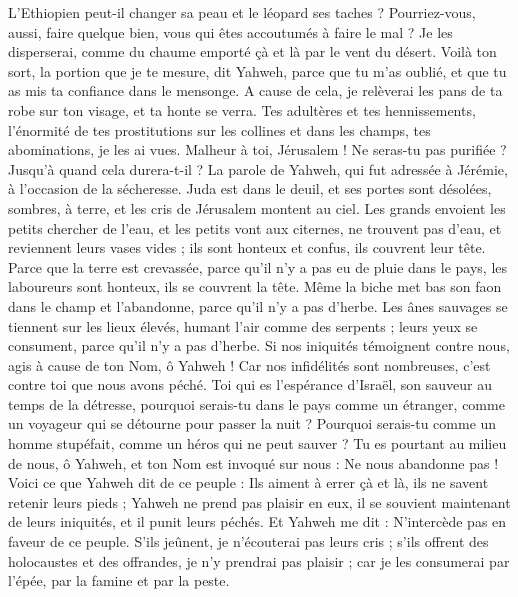 \begin{multicols}{2}
L'Ethiopien peut-il changer sa peau et le léopard ses taches ? Pourriez-vous, aussi, faire quelque bien, vous qui êtes accoutumés à faire le mal ?
Je les disperserai, comme du chaume emporté çà et là par le vent du désert.
Voilà ton sort, la portion que je te mesure, dit Yahweh, parce que tu m'as oublié, et que tu as mis ta confiance dans le mensonge.
A cause de cela, je relèverai les pans de ta robe sur ton visage, et ta honte se verra.
Tes adultères et tes hennissements, l'énormité de tes prostitutions sur les collines et dans les champs, tes abominations, je les ai vues. Malheur à toi, Jérusalem ! Ne seras-tu pas purifiée ? Jusqu'à quand cela durera-t-il ?
\VerseOne{}La parole de Yahweh, qui fut adressée à Jérémie, à l'occasion de la sécheresse.
Juda est dans le deuil, et ses portes sont désolées, sombres, à terre, et les cris de Jérusalem montent au ciel.
Les grands envoient les petits chercher de l'eau, et les petits vont aux citernes, ne trouvent pas d'eau, et reviennent leurs vases vides ; ils sont honteux et confus, ils couvrent leur tête.
Parce que la terre est crevassée, parce qu'il n'y a pas eu de pluie dans le pays, les laboureurs sont honteux, ils se couvrent la tête.
Même la biche met bas son faon dans le champ et l'abandonne, parce qu'il n'y a pas d'herbe.
Les ânes sauvages se tiennent sur les lieux élevés, humant l'air comme des serpents ; leurs yeux se consument, parce qu'il n'y a pas d'herbe.
Si nos iniquités témoignent contre nous, agis à cause de ton Nom, ô Yahweh ! Car nos infidélités sont nombreuses, c'est contre toi que nous avons péché.
Toi qui es l'espérance d'Israël, son sauveur au temps de la détresse, pourquoi serais-tu dans le pays comme un étranger, comme un voyageur qui se détourne pour passer la nuit ?
Pourquoi serais-tu comme un homme stupéfait, comme un héros qui ne peut sauver ? Tu es pourtant au milieu de nous, ô Yahweh, et ton Nom est invoqué sur nous : Ne nous abandonne pas !
Voici ce que Yahweh dit de ce peuple : Ils aiment à errer çà et là, ils ne savent retenir leurs pieds ; Yahweh ne prend pas plaisir en eux, il se souvient maintenant de leurs iniquités, et il punit leurs péchés.
Et Yahweh me dit : N'intercède pas en faveur de ce peuple.
S'ils jeûnent, je n'écouterai pas leurs cris ; s'ils offrent des holocaustes et des offrandes, je n'y prendrai pas plaisir ; car je les consumerai par l'épée, par la famine et par la peste.

\end{multicols}
